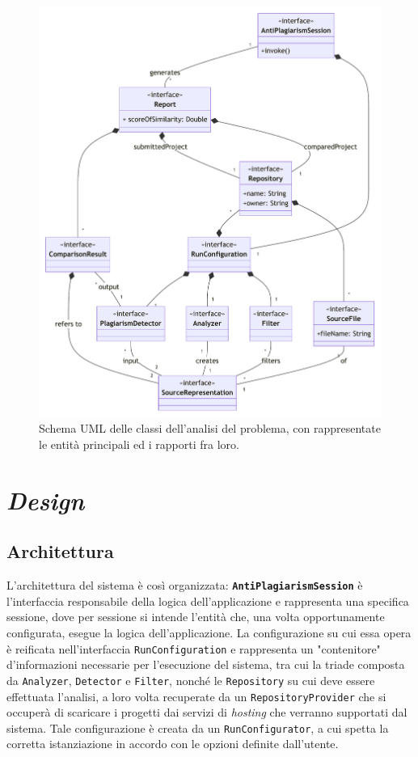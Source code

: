 \begin{figure}[h!]
    \centering
    \includegraphics[width=\textwidth]{resources/img/02-domain.pdf}
    \caption{Schema UML delle classi dell'analisi del problema, con rappresentate le entità principali ed i rapporti fra loro.}
    \label{img:02-domain}
\end{figure}

\newpage

\section{\textit{Design}}

\subsection{Architettura}
\label{02-architecture}
L'architettura del sistema è così organizzata: \textbf{\texttt{AntiPlagiarismSession}} è l'interfaccia responsabile della logica dell'applicazione e rappresenta una specifica sessione, dove per sessione si intende l'entità che, una volta opportunamente configurata, esegue la logica dell'applicazione.
%
La configurazione su cui essa opera è reificata nell'interfaccia \texttt{RunConfiguration} e rappresenta un "contenitore" d'informazioni necessarie per l'esecuzione del sistema, tra cui la triade composta da \texttt{Analyzer}, \texttt{Detector} e \texttt{Filter}, nonché le \texttt{Repository} su cui deve essere effettuata l'analisi, a loro volta recuperate da un \texttt{RepositoryProvider} che si occuperà di scaricare i progetti dai servizi di \textit{hosting} che verranno supportati dal sistema.
%
Tale configurazione è creata da un \texttt{RunConfigurator}, a cui spetta la corretta istanziazione in accordo con le opzioni definite dall'utente.

